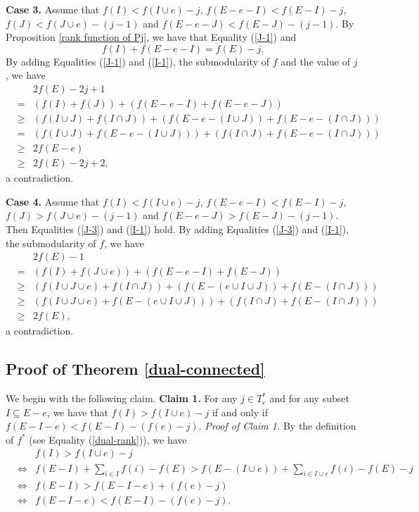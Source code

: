 \documentclass[preprint,10pt]{elsarticle}
\theoremstyle{plain}
\theoremstyle{definition}
\theoremstyle{remark}
\begin{document}
 \vskip0.2cm
\noindent\textbf{Case 3.} Assume that \(f(I) < f(I\cup e)-j\), \(f(E-e-I) < f(E-I)-j\), \(f(J) < f(J\cup e)-(j-1)\) and \(f(E-e-J) < f(E-J)-(j-1)\).
\vskip0.2cm
By Proposition \ref{rank function of Pj}, we have that Equality (\ref{J-1}) and
\begin{equation}\label{I-1}
f(I) + f(E-e-I) = f(E)-j.
\end{equation}
By adding Equalities (\ref{J-1}) and (\ref{I-1}), the submodularity of $f$ and the value of $j$, we have
\begin{eqnarray*}
&&2f(E)-2j+1\\
&=&(f(I) + f(J))+ (f(E-e-I) + f(E-e-J))\\
&\ge &(f(I \cup J) + f(I \cap J))+ (f(E-e-(I \cup J)) + f(E-e-(I \cap J))) \\
&= &(f(I \cup J) +f(E-e-(I \cup J)))+ (f(I \cap J) + f(E-e-(I \cap J))) \\
 &\ge& 2f(E-e)\\
 &\ge& 2f(E)-2j+2,
 \end{eqnarray*}
a contradiction.

 \vskip0.2cm
\noindent\textbf{Case 4.} Assume that \(f(I) < f(I\cup e)-j\), \(f(E-e-I) < f(E-I)-j\), \(f(J) >f(J\cup e)-(j-1)\) and \(f(E-e-J) > f(E-J)-(j-1)\).
\vskip0.2cm
Then  Equalities (\ref{J-3})  and (\ref{I-1}) hold.
 By adding Equalities (\ref{J-3}) and (\ref{I-1}), the submodularity of $f$, we have
\begin{eqnarray*}
&&2f(E)-1\\
&=&(f(I) + f(J\cup e))+ (f(E-e-I) + f(E-J))\\
&\ge& (f(I \cup J\cup e) + f(I \cap J))+ (f(E-(e\cup I \cup J)) + f(E-(I \cap J))) \\
&\ge& (f(I \cup J\cup e) + f(E-(e\cup I \cup J)))+ (f(I \cap J)+ f(E-(I \cap J))) \\
 &\ge& 2f(E),
 \end{eqnarray*}
a contradiction.


 \subsection{Proof of Theorem \ref{dual-connected}}
\noindent
We begin with the following claim.
\vskip0.2cm
\noindent\textbf{Claim 1.} For any $j\in T^*_{e}$ and for any subset $I\subseteq E-e$, we have that \(f(I) > f(I\cup e)-j\) if and only if \(f(E-I-e)<f(E-I) -(f(e) -j)\).
\vskip0.1cm
\noindent\emph{Proof of Claim 1.}  By the definition of $f^*$ (see Equality (\ref{dual-rank})), we have
 \begin{eqnarray*}
&& f(I) > f(I\cup e)-j\\
 & \Leftrightarrow &f(E-I) + \sum_{i \in I} f(i) - f(E)>f(E-(I\cup e)) + \sum_{i \in I\cup e} f(i) - f(E)-j\\
  & \Leftrightarrow &f(E-I)>f(E-I-e)+(f(e) -j)\\
 & \Leftrightarrow &f(E-I-e)<f(E-I) -(f(e) -j).
  \end{eqnarray*}
\end{document}

